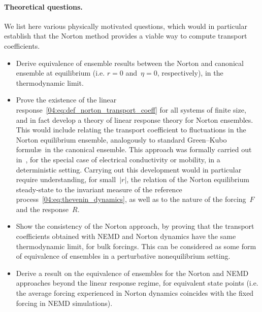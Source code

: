 \paragraph{Theoretical questions.}
We list here various physically motivated questions, which would in particular establish that the Norton method provides a viable way to compute transport coefficients.
\begin{itemize}
    \item Derive equivalence of ensemble results between the Norton and canonical ensemble at equilibrium (i.e. $r=0$ and~$\eta = 0$, respectively), in the thermodynamic limit.
    \item Prove the existence of the linear response~\eqref{04:eq:def_norton_transport_coeff} for all systems of finite size, and in fact develop a theory of linear response theory for Norton ensembles. This would include relating the transport coefficient to fluctuations in the Norton equilibrium ensemble, analogously to standard Green--Kubo formul\ae\ in the canonical ensemble. This approach was formally carried out in~\cite{EM85}, for the special case of electrical conductivity or mobility, in a deterministic setting. Carrying out this development would in particular require understanding, for small~$|r|$, the relation of the Norton equilibrium steady-state to the invariant measure of the reference process~\eqref{04:eq:thevenin_dynamics}, as well as to the nature of the forcing~$F$ and the response~$R$.
    \item Show the consistency of the Norton approach, by proving that the transport coefficients obtained with NEMD and Norton dynamics have the same thermodynamic limit, for bulk forcings. This can be considered as some form of equivalence of ensembles in a perturbative nonequilibrium setting.
    \item Derive a result on the equivalence of ensembles for the Norton and NEMD approaches beyond the linear response regime, for equivalent state points (i.e. the average forcing experienced in Norton dynamics coincides with the fixed forcing in NEMD simulations).
\end{itemize}
